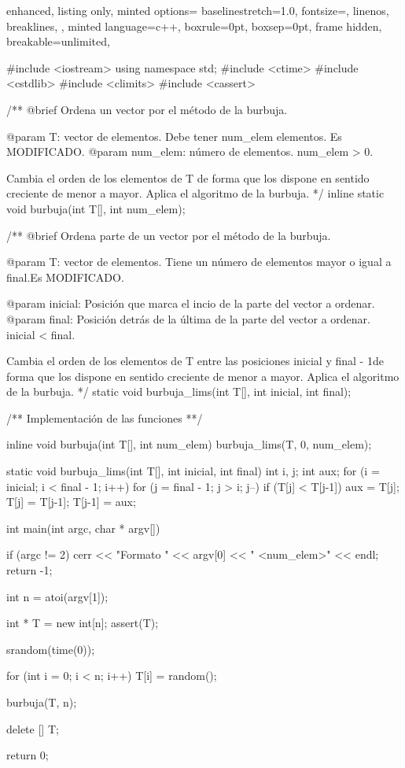 \documentclass[12pt,spanish]{article}
\begin{document}
\begin{multicols}{2}
\begin{tcblisting}
{
  enhanced,
  listing only,
  minted options={
    baselinestretch=1.0,
    fontsize=\footnotesize,
    linenos,
    breaklines,
  },
  minted language=c++,
  boxrule=0pt,
  boxsep=0pt,
  frame hidden,
  breakable=unlimited,
}

#include <iostream>
using namespace std;
#include <ctime>
#include <cstdlib>
#include <climits>
#include <cassert>

/**
   @brief Ordena un vector por el método de la burbuja.

   @param T: vector de elementos. Debe tener num_elem elementos.
             Es MODIFICADO.
   @param num_elem: número de elementos. num_elem > 0.

   Cambia el orden de los elementos de T de forma que los dispone
   en sentido creciente de menor a mayor.
   Aplica el algoritmo de la burbuja.
*/
inline static 
void burbuja(int T[], int num_elem);

/**
   @brief Ordena parte de un vector por el método de la burbuja.

   @param T: vector de elementos. Tiene un número de elementos 
                   mayor o igual a final.Es MODIFICADO.

   @param inicial: Posición que marca el incio de la parte del
                   vector a ordenar.
   @param final: Posición detrás de la última de la parte del
                   vector a ordenar. 
		   inicial < final.

   Cambia el orden de los elementos de T entre las posiciones
   inicial y final - 1de forma que los dispone en sentido creciente
   de menor a mayor.
   Aplica el algoritmo de la burbuja.
*/
static void burbuja_lims(int T[], int inicial, int final);

/**
   Implementación de las funciones
**/

inline void burbuja(int T[], int num_elem)
{
  burbuja_lims(T, 0, num_elem);
}

static void burbuja_lims(int T[], int inicial, int final)
{
  int i, j;
  int aux;
  for (i = inicial; i < final - 1; i++)
    for (j = final - 1; j > i; j--)
      if (T[j] < T[j-1])
	{
	  aux = T[j];
	  T[j] = T[j-1];
	  T[j-1] = aux;
	}
}

int main(int argc, char * argv[])
{
    if (argc != 2)
    {
      cerr << "Formato " << argv[0] << " <num_elem>" << endl;
      return -1;
    }

  int n = atoi(argv[1]);

  int * T = new int[n];
  assert(T);

  srandom(time(0));

  for (int i = 0; i < n; i++)
    {
      T[i] = random();
    }

  burbuja(T, n);

  delete [] T;

  return 0;
}
\end{tcblisting}
\end{multicols}
\newpage
\end{document}
